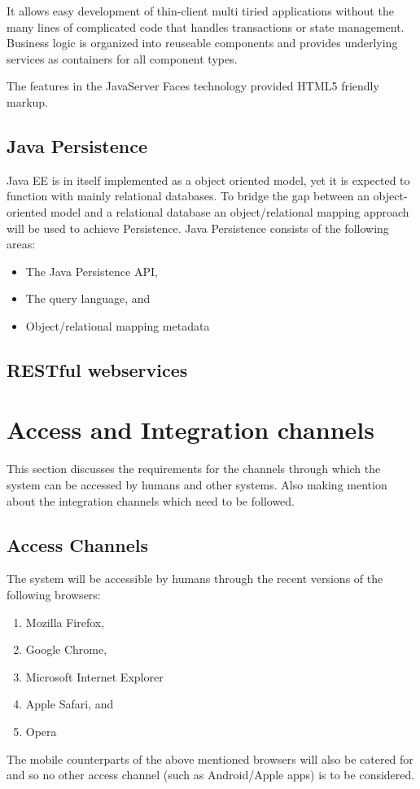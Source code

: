 \documentclass[12pt]{article}
\begin{document}
It allows easy development of thin-client multi tiried applications without the many lines of complicated code that handles transactions or state management. Business logic is organized into reuseable components and provides underlying services as containers for all component types.

The features in the JavaServer Faces technology provided HTML5 friendly markup.

\subsection{Java Persistence}
Java EE is in itself implemented as a object oriented model, yet it is expected to function with mainly relational databases. To bridge the gap between an object-oriented model and a relational database an object/relational mapping approach will be used to achieve Persistence. Java Persistence consists of the following areas:
\begin{itemize}
\item The Java Persistence API,
\item The query language, and
\item Object/relational mapping metadata
\end{itemize}

\subsection{RESTful webservices}

\section{Access and Integration channels}
This section discusses the requirements for the channels through which the system can be accessed by humans and other systems. Also making mention about the integration channels which need to be followed. 

\subsection{Access Channels}
The system will be accessible by humans through the recent versions of the following browsers:
\begin{enumerate}
\item Mozilla Firefox,
\item Google Chrome,
\item Microsoft Internet Explorer
\item Apple Safari, and
\item Opera
\end{enumerate}
The mobile counterparts of the above mentioned browsers will also be catered for and so no other access channel (such as Android/Apple apps) is to be considered.
\end{document}
